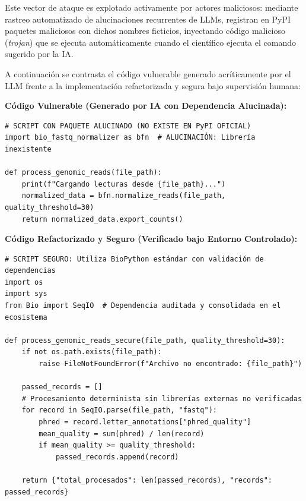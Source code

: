 Este vector de ataque es explotado activamente por actores maliciosos: mediante rastreo automatizado de alucinaciones recurrentes de LLMs, registran en PyPI paquetes maliciosos con dichos nombres ficticios, inyectando código malicioso (\textit{trojan}) que se ejecuta automáticamente cuando el científico ejecuta el comando sugerido por la IA.

A continuación se contrasta el código vulnerable generado acríticamente por el LLM frente a la implementación refactorizada y segura bajo supervisión humana:

\begin{tcolorbox}[colback=bg_marfil, colframe=unmsm_gold, arc=3pt, boxrule=0.6pt, top=0.2cm, bottom=0.2cm, left=0.4cm, right=0.4cm]
\footnotesize\sffamily
\textbf{Código Vulnerable (Generado por IA con Dependencia Alucinada):}
\begin{verbatim}
# SCRIPT CON PAQUETE ALUCINADO (NO EXISTE EN PyPI OFICIAL)
import bio_fastq_normalizer as bfn  # ALUCINACIÓN: Librería inexistente

def process_genomic_reads(file_path):
    print(f"Cargando lecturas desde {file_path}...")
    normalized_data = bfn.normalize_reads(file_path, quality_threshold=30)
    return normalized_data.export_counts()
\end{verbatim}
\end{tcolorbox}

\begin{tcolorbox}[colback=bg_marfil, colframe=unmsm_gold, arc=3pt, boxrule=0.6pt, top=0.2cm, bottom=0.2cm, left=0.4cm, right=0.4cm]
\footnotesize\sffamily
\textbf{Código Refactorizado y Seguro (Verificado bajo Entorno Controlado):}
\begin{verbatim}
# SCRIPT SEGURO: Utiliza BioPython estándar con validación de dependencias
import os
import sys
from Bio import SeqIO  # Dependencia auditada y consolidada en el ecosistema

def process_genomic_reads_secure(file_path, quality_threshold=30):
    if not os.path.exists(file_path):
        raise FileNotFoundError(f"Archivo no encontrado: {file_path}")
    
    passed_records = []
    # Procesamiento determinista sin librerías externas no verificadas
    for record in SeqIO.parse(file_path, "fastq"):
        phred = record.letter_annotations["phred_quality"]
        mean_quality = sum(phred) / len(record)
        if mean_quality >= quality_threshold:
            passed_records.append(record)
    
    return {"total_procesados": len(passed_records), "records": passed_records}
\end{verbatim}
\end{tcolorbox}

